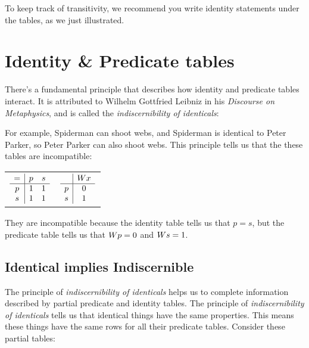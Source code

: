 \documentclass[PHIL101-Textbook.tex]{subfiles}
\begin{document}
\noindent To keep track of transitivity, we recommend you write identity statements under the tables, as we just illustrated. 


\section{Identity \& Predicate tables}

There's a fundamental principle that describes how identity and predicate tables interact. It is attributed to Wilhelm Gottfried Leibniz in his \emph{Discourse on Metaphysics}, and is called the \emph{indiscernibility of identicals}:


\noindent For example, Spiderman can shoot webs, and Spiderman is identical to Peter Parker, so Peter Parker can also shoot webs. This principle tells us that the these tables are incompatible:


\begin{center}
  \begin{tabular}{ll}
	$\begin{array}{c|cc}
	   = & p & s\\ \hline
	   p &1&1\\
	   s &1&1
	 \end{array}$
 &
	$\begin{array}{c|c}
		 & \mathord{W}{x}\\ \hline
	   p & 0 \\
	   s & 1 
	 \end{array}$
  \end{tabular}
\end{center}

\noindent They are incompatible because the identity table tells us that $p = s$, but the predicate table tells us that $\mathord{W}{p} = 0$ and $\mathord{W}{s} =1$.

\medskip

\subsection*{Identical implies Indiscernible}

The principle of \emph{indiscernibility of identicals} helps us to complete information described by partial predicate and identity tables. The principle of \emph{indiscernibility of identicals} tells us that identical things have the same properties. This means these things have the same rows for all their predicate tables. Consider these partial tables: 
\end{document}
